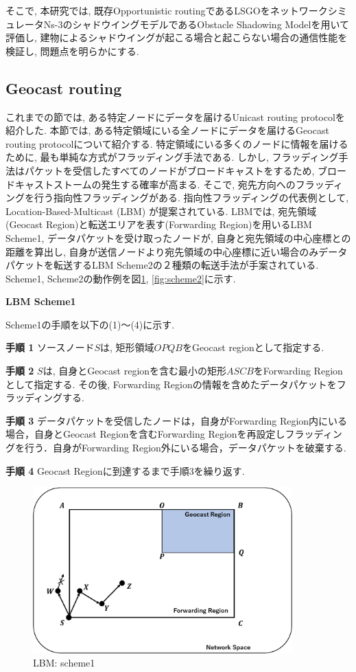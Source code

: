 \documentclass[10pt]{jreport}
\begin{document}
そこで, 本研究では, 既存Opportunistic routingであるLSGOをネットワークシミュレータNs-3\cite{19}のシャドウイングモデルであるObstacle Shadowing Model\cite{20}を用いて評価し, 建物によるシャドウイングが起こる場合と起こらない場合の通信性能を検証し, 問題点を明らかにする.


\subsection{Geocast routing}
これまでの節では, ある特定ノードにデータを届けるUnicast routing protocolを紹介した.
本節では, ある特定領域にいる全ノードにデータを届けるGeocast routing protocol\cite{Geocast}について紹介する.
特定領域にいる多くのノードに情報を届けるために, 最も単純な方式がフラッディング手法である.
しかし, フラッディング手法はパケットを受信したすべてのノードがブロードキャストをするため, ブロードキャストストームの発生する確率が高まる.
そこで, 宛先方向へのフラッディングを行う指向性フラッディングがある. 指向性フラッディングの代表例として, Location-Based-Multicast (LBM) \cite{LBM}が提案されている.
LBMでは, 宛先領域(Geocast Region)と転送エリアを表す(Forwarding Region)を用いるLBM Scheme1, データパケットを受け取ったノードが, 自身と宛先領域の中心座標との距離を算出し, 自身が送信ノードより宛先領域の中心座標に近い場合のみデータパケットを転送するLBM Scheme2の２種類の転送手法が手案されている.
Scheme1, Scheme2の動作例を図\ref{fig:scheme1}, \ref{fig:scheme2}に示す.

\par
\vspace{5mm}
\noindent
\textbf{LBM Scheme1}
\vspace{5mm}

Scheme1の手順を以下の(1)～(4)に示す.


\textbf{手順 1} ソースノード$S$は, 矩形領域$OPQB$をGeocast regionとして指定する.

\textbf{手順 2} $S$は, 自身とGeocast regionを含む最小の矩形$ASCB$をForwarding Regionとして指定する. その後, Forwarding Regionの情報を含めたデータパケットをフラッディングする.

\textbf{手順 3} データパケットを受信したノードは，自身がForwarding Region内にいる場合，自身とGeocast Regionを含むForwarding Regionを再設定しフラッディングを行う．自身がForwarding Region外にいる場合，データパケットを破棄する.

\textbf{手順 4} Geocast Regionに到達するまで手順3を繰り返す. 


\begin{figure}[!ht]
	\centering
	\includegraphics[width=100mm]{figures/Scheme1.eps}
	\caption{LBM: scheme1}
	\label{fig:scheme1}
\end{figure}
\end{document}
